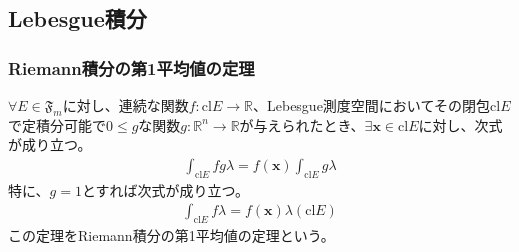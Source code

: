 \documentclass[dvipdfmx]{jsarticle}
\begin{document}
\subsection{Lebesgue積分}%
\subsubsection{Riemann積分の第1平均値の定理}%
\begin{thm}\label{4.6.6.1}
$\forall E \in \mathfrak{F}_{m}$に対し、連続な関数$f:\mathrm{cl}E \rightarrow \mathbb{R}$、Lebesgue測度空間においてその閉包$\mathrm{cl}E$で定積分可能で$0 \leq g$な関数$g:\mathbb{R}^{n} \rightarrow \mathbb{R}$が与えられたとき、$\exists\mathbf{x} \in \mathrm{cl}E$に対し、次式が成り立つ。
\begin{align*}
\int_{\mathrm{cl}E} {fg\lambda} = f\left( \mathbf{x} \right)\int_{\mathrm{cl}E} {g\lambda}
\end{align*}
特に、$g = 1$とすれば次式が成り立つ。
\begin{align*}
\int_{\mathrm{cl}E} {f\lambda} = f\left( \mathbf{x} \right)\lambda\left( \mathrm{cl}E \right)
\end{align*}
この定理をRiemann積分の第1平均値の定理という。
\end{thm}
\end{document}
